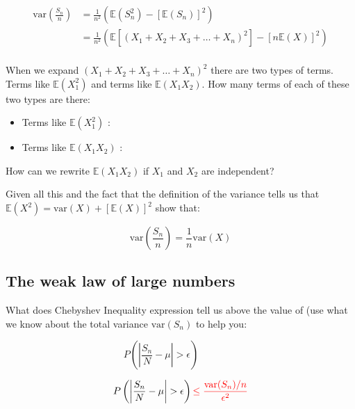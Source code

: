 \documentclass[paper=a4, fontsize=11pt]{scrartcl}
\newcommand{\red}[1]{{\color{red}#1}}
\numberwithin{equation}{section}
\numberwithin{figure}{section}
\numberwithin{table}{section}
\begin{document}
\begin{equation}
\begin{aligned}
\textrm{var}\left(\frac{S_n}{n}\right) & = \frac{1}{n^2} \left(
\mathbb{E}(S_n^2) - [\mathbb{E}(S_n)]^2 \right)  \\
 & = \frac{1}{n^2} \left(  \mathbb{E}[ (X_1 + X_2 + X_3 + \dots + X_n)^2] -
[n\mathbb{E}(X)]^2 \right) \\
\end{aligned}
\end{equation}

When we expand $(X_1 + X_2 + X_3 + \dots + X_n)^2$ there are two types of terms.
 Terms like 
$\mathbb{E}(X_1^2)$ and terms like $\mathbb{E}(X_1X_2)$.  How many terms of each of these 
two types are there:

\begin{itemize}
 \item Terms like $\mathbb{E}(X_1^2)$ : 
 \item Terms like $\mathbb{E}(X_1X_2)$ :
\end{itemize}

How can we rewrite $\mathbb{E}(X_1X_2)$ if $X_1$ and $X_2$ are independent?

\vspace{2cm}

Given all this and the fact that the definition of the variance tells us that $\mathbb{E}(X^2) = \textrm{var}(X) + [\mathbb{E}(X)]^2$ show that:

$$
\textrm{var}\left(\frac{S_n}{n}\right) = \frac{1}{n} \textrm{var}(X)
$$

\vspace{5cm}

\subsection{The weak law of large numbers}

What does Chebyshev Inequality expression tell us above the value of (use what
we know about the total variance $\textrm{var}(S_n)$ to help you:

\begin{questions}
\begin{equation}
 P\left( \left | \frac{S_n}{N} - \mu \right | > \epsilon \right) \qquad \qquad 
\end{equation}
\end{questions}

\begin{answers}
\begin{equation}
 P\left( \left | \frac{S_n}{N} - \mu \right | > \epsilon \right) \red{ \le
\frac{ \textrm{var}(S_n) / n }{ \epsilon^2 } } 
 \end{equation}
\end{answers}
\end{document}
